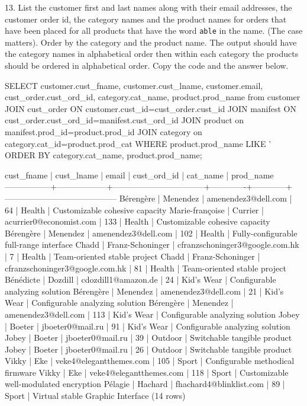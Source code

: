 13. List the customer first and last names along with their email addresses, the customer order id, the category names and the product names for orders that have been placed for all products that have the word \texttt{able} in the name. (The case matters). Order by the category and the product name. The output should have the category names in alphabetical order then within each category the products should be ordered in alphabetical order. Copy the code and the answer below.
\begin{sql}
SELECT customer.cust_fname, customer.cust_lname, customer.email, cust_order.cust_ord_id, category.cat_name, product.prod_name from customer
JOIN cust_order ON customer.cust_id=cust_order.cust_id
JOIN manifest ON cust_order.cust_ord_id=manifest.cust_ord_id
JOIN product on manifest.prod_id=product.prod_id
JOIN category on category.cat_id=product.prod_cat
WHERE product.prod_name LIKE '%
ORDER BY category.cat_name, product.prod_name;
\end{sql}
\begin{pseudo*}
   cust_fname    |    cust_lname    |              email              | cust_ord_id |  cat_name  |               
 prod_name
-----------------+------------------+---------------------------------+-------------+------------+-----------------------------------------
 Bérengère       | Menendez         | amenendez3@dell.com             |          64 | Health     | Customizable cohesive capacity
 Marie-françoise | Currier          | acurrier0@economist.com         |         133 | Health     | Customizable cohesive capacity
 Bérengère       | Menendez         | amenendez3@dell.com             |         102 | Health     | Fully-configurable full-range interface
 Chadd           | Franz-Schoninger | cfranzschoninger3@google.com.hk |           7 | Health     | Team-oriented stable project
 Chadd           | Franz-Schoninger | cfranzschoninger3@google.com.hk |          81 | Health     | Team-oriented stable project
 Bénédicte       | Dozdill          | cdozdill1@amazon.de             |          24 | Kid's Wear | Configurable analyzing solution
 Bérengère       | Menendez         | amenendez3@dell.com             |          21 | Kid's Wear | Configurable analyzing solution
 Bérengère       | Menendez         | amenendez3@dell.com             |         113 | Kid's Wear | Configurable analyzing solution
 Jobey           | Boeter           | jboeter0@mail.ru                |          91 | Kid's Wear | Configurable analyzing solution
 Jobey           | Boeter           | jboeter0@mail.ru                |          39 | Outdoor    | Switchable tangible product
 Jobey           | Boeter           | jboeter0@mail.ru                |          26 | Outdoor    | Switchable tangible product
 Vikky           | Eke              | veke4@elegantthemes.com         |         105 | Sport      | Configurable methodical firmware
 Vikky           | Eke              | veke4@elegantthemes.com         |         118 | Sport      | Customizable well-modulated encryption
 Pélagie         | Hachard          | fhachard4@blinklist.com         |          89 | Sport      | Virtual stable Graphic Interface
(14 rows)
\end{pseudo*}